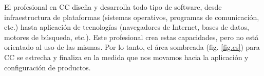 El profesional en \ac{CC} diseña y desarrolla todo tipo de software, desde infraestructura de plataformas (sistemas operativos, programas de comunicación, etc.) hasta aplicación de tecnologías (navegadores de Internet, bases de datos, motores de búsqueda, etc.). Este profesional crea estas capacidades, pero no está orientado al uso de las mismas. Por lo tanto, el área sombreada (fig. \ref{fig.cs}) para \ac{CC} se estrecha y finaliza en la medida que nos movamos hacia la aplicación y configuración de productos.
